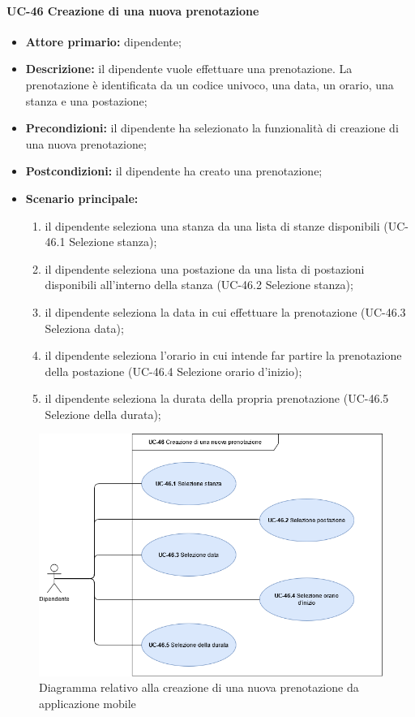 
\paragraph{UC-46 Creazione di una nuova prenotazione}
    \begin{itemize}
	    \item \textbf{Attore primario:} dipendente;

	    \item \textbf{Descrizione:} il dipendente vuole effettuare una prenotazione. La prenotazione è identificata da un codice univoco, una data, un orario, una stanza e una postazione;

	    \item \textbf{Precondizioni:} il dipendente ha selezionato la funzionalità di creazione di una nuova prenotazione;

	    \item \textbf{Postcondizioni:} il dipendente ha creato una prenotazione;

	    \item \textbf{Scenario principale:}
	        \begin{enumerate}
		        \item il dipendente seleziona una stanza da una lista di stanze disponibili (UC-46.1 Selezione stanza);
		        \item il dipendente seleziona una postazione da una lista di postazioni disponibili all'interno della stanza (UC-46.2 Selezione stanza); 
		        \item il dipendente seleziona la data in cui effettuare la prenotazione (UC-46.3 Seleziona data);
		        \item il dipendente seleziona l'orario in cui intende far partire la prenotazione della postazione (UC-46.4 Selezione orario d'inizio);
		        \item il dipendente seleziona la durata della propria prenotazione (UC-46.5 Selezione della durata);
	        \end{enumerate}
    \end{itemize}

    \begin{figure}[H]
		\centering
		  \includegraphics[scale=0.50]{src/CasiDUso/immagini/CreazionePrenotazione.png}
		\caption{Diagramma relativo alla creazione di una nuova prenotazione da applicazione mobile}
	\end{figure}

